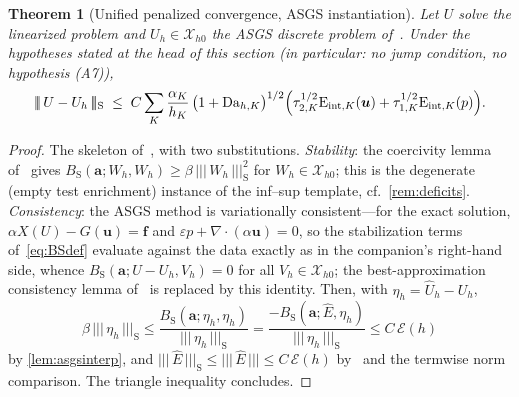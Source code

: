 \documentclass[11pt]{article}
\newtheorem{theorem}{Theorem}[section]
\theoremstyle{remark}
\newcommand{\bu}{\boldsymbol{u}}
\newcommand{\ba}{\boldsymbol{a}}
\newcommand{\bff}{\boldsymbol{f}}
\newcommand{\tnorm}[1]{\lvert\!\lvert\!\lvert\, #1 \,\rvert\!\rvert\!\rvert}
\newcommand{\Eint}[2]{\mathrm{E}_{\mathrm{int},#1}(#2)}
\newcommand{\Dah}{\mathrm{Da}_{h,K}}
\newcommand{\Xhz}{\mathcal{X}_{h0}}
\newcommand{\Bs}{B_{\mathrm{S}}}
\newcommand{\EF}{\mathcal{E}}
\begin{document}
\begin{theorem}[Unified penalized convergence, ASGS instantiation]
\label{th:unifiedASGS}
Let $U$ solve the linearized problem and $U_h \in \Xhz$ the ASGS discrete problem
of~\cite{companion}. Under the hypotheses stated at the head of this section
(in particular: no jump condition, no hypothesis (A7)),
\begin{equation}
  \label{eq:UnifiedASGS}
  \tnorm{U - U_h}_{\mathrm{S}}
  \;\le\;
  C \sum_K \frac{\alpha_K}{h_K}\,\bigl(1+\Dah\bigr)^{1/2}
  \Bigl( \tau_{2,K}^{1/2}\Eint{K}{\bu} + \tau_{1,K}^{1/2}\Eint{K}{p} \Bigr).
\end{equation}
\end{theorem}

\begin{proof}
The skeleton of~\cite[Theorem~6.4]{OSGSnote}, with two substitutions.
\emph{Stability}: the coercivity lemma of~\cite{companion} gives
$\Bs(\ba; W_h, W_h) \ge \beta\,\tnorm{W_h}_{\mathrm{S}}^2$ for $W_h \in \Xhz$; this
is the degenerate (empty test enrichment) instance of the inf--sup template, cf.\
\cref{rem:deficits}. \emph{Consistency}: the ASGS method is variationally
consistent---for the exact solution, $\alpha X(U) - G(\bu) = \bff$ and
$\varepsilon p + \nabla\cdot(\alpha\bu) = 0$, so the stabilization terms
of~\cref{eq:BSdef} evaluate against the data exactly as in the companion's
right-hand side, whence $\Bs(\ba; U - U_h, V_h) = 0$ for all $V_h \in \Xhz$; the
best-approximation consistency lemma of~\cite{OSGSnote} is replaced by this
identity. Then, with $\eta_h = \hat U_h - U_h$,
\[
  \beta\,\tnorm{\eta_h}_{\mathrm{S}}
  \le \frac{\Bs(\ba;\eta_h,\eta_h)}{\tnorm{\eta_h}_{\mathrm{S}}}
  = \frac{-\Bs(\ba;\hat E,\eta_h)}{\tnorm{\eta_h}_{\mathrm{S}}}
  \le C\,\EF(h)
\]
by \cref{lem:asgsinterp}, and
$\tnorm{\hat E}_{\mathrm{S}} \le \tnorm{\hat E} \le C\,\EF(h)$
by~\cite[Lemma~6.5]{OSGSnote} and the termwise norm comparison. The triangle
inequality concludes.
\end{proof}
\end{document}
